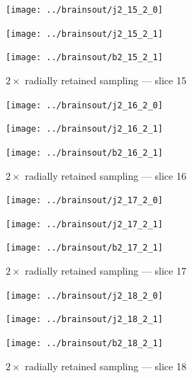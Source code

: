 \documentclass{article}
\begin{document}
\begin{figure}
\begin{centering}

\parbox{\imsizes}{\texttt{[image: ../brainsout/j2\_15\_2\_0]}}

\vspace{\vertseps}

\parbox{\imsizes}{\texttt{[image: ../brainsout/j2\_15\_2\_1]}}
\hfill
\parbox{\imsizes}{\texttt{[image: ../brainsout/b2\_15\_2\_1]}}

\end{centering}
\caption{$2\times$ radially retained sampling --- slice 15}
\end{figure}


\begin{figure}
\begin{centering}

\parbox{\imsizes}{\texttt{[image: ../brainsout/j2\_16\_2\_0]}}

\vspace{\vertseps}

\parbox{\imsizes}{\texttt{[image: ../brainsout/j2\_16\_2\_1]}}
\hfill
\parbox{\imsizes}{\texttt{[image: ../brainsout/b2\_16\_2\_1]}}

\end{centering}
\caption{$2\times$ radially retained sampling --- slice 16}
\end{figure}


\begin{figure}
\begin{centering}

\parbox{\imsizes}{\texttt{[image: ../brainsout/j2\_17\_2\_0]}}

\vspace{\vertseps}

\parbox{\imsizes}{\texttt{[image: ../brainsout/j2\_17\_2\_1]}}
\hfill
\parbox{\imsizes}{\texttt{[image: ../brainsout/b2\_17\_2\_1]}}

\end{centering}
\caption{$2\times$ radially retained sampling --- slice 17}
\end{figure}


\begin{figure}
\begin{centering}

\parbox{\imsizes}{\texttt{[image: ../brainsout/j2\_18\_2\_0]}}

\vspace{\vertseps}

\parbox{\imsizes}{\texttt{[image: ../brainsout/j2\_18\_2\_1]}}
\hfill
\parbox{\imsizes}{\texttt{[image: ../brainsout/b2\_18\_2\_1]}}

\end{centering}
\caption{$2\times$ radially retained sampling --- slice 18}
\end{figure}
\end{document}
